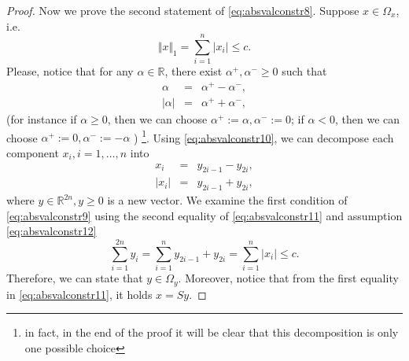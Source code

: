 \begin{proof}
\noindent Now we prove the second statement of \eqref{eq:absvalconstr8}. Suppose $x \in \Omega_x$, i.e.
\begin{equation}
 \label{eq:absvalconstr12}
 \Vert x \Vert_1 = \sum\limits_{i=1}^n \vert x_i \vert \leq c.
\end{equation}
Please, notice that for any $\alpha \in \mathbb{R}$, there exist $\alpha^{+}, \alpha^{-} \geq 0$ such that
\begin{equation}
 \label{eq:absvalconstr10}
 \begin{array}{rcl}
  \alpha & = & \alpha^{+} - \alpha^{-}, \\
  \vert \alpha \vert & = & \alpha^{+} + \alpha^{-},
 \end{array}
\end{equation}
(for instance
if $\alpha \geq 0$, then we can choose $\alpha^{+}:=\alpha, \alpha^{-}:=0$;
if $\alpha < 0$, then we can choose $\alpha^{+}:=0, \alpha^{-}:= -\alpha$ )
\footnote{in fact, in the end of the proof it will be clear that this decomposition is only one possible choice}.
Using \eqref{eq:absvalconstr10}, we can decompose each component $x_i, i=1,\dots,n$ into
\begin{equation}
 \label{eq:absvalconstr11}
 \begin{array}{rcl}
  x_i & = & y_{2i-1} - y_{2i}, \\
  \vert x_i \vert & = & y_{2i-1} + y_{2i},
 \end{array}
\end{equation}
where $y \in \mathbb{R}^{2n}, y \geq 0$ is a new vector.
We examine the first condition of \eqref{eq:absvalconstr9} using the second equality of \eqref{eq:absvalconstr11} 
and assumption \eqref{eq:absvalconstr12}
\begin{displaymath}
 \sum\limits_{i=1}^{2n} y_i = \sum\limits_{i =1}^{n} y_{2i-1} + y_{2i} = \sum\limits_{i=1}^{n} \vert x_i \vert \leq c.
\end{displaymath}
Therefore, we can state that $y \in \Omega_y$. Moreover, notice that from the first equality in \eqref{eq:absvalconstr11}, it holds $x = Sy$.

\vspace{0.5cm}


\end{proof}
